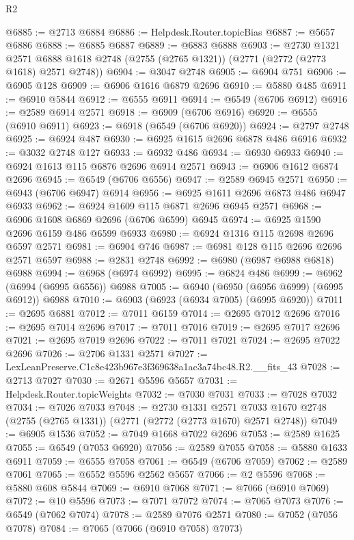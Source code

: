\begin{lexlean}{R2}
\begin{coremodule}
@6885 := @2713 @6884
@6886 := Helpdesk.Router.topicBias
@6887 := @5657 @6886
@6888 := @6885 @6887
@6889 := @6883 @6888
@6903 := @2730
    @1321
    @2571
    @6888
    @1618
    @2748
    (@2755 (@2765 @1321))
    (@2771 (@2772 (@2773 @1618) @2571 @2748))
@6904 := @3047 @2748
@6905 := @6904 @751
@6906 := @6905 @128
@6909 := @6906 @1616 @6879 @2696
@6910 := @5880 @485
@6911 := @6910 @5844
@6912 := @6555 @6911
@6914 := @6549 (@6706 @6912)
@6916 := @2589 @6914 @2571
@6918 := @6909 (@6706 @6916)
@6920 := @6555 (@6910 @6911)
@6923 := @6918 (@6549 (@6706 @6920))
@6924 := @2797 @2748
@6925 := @6924 @487
@6930 := @6925 @1615 @2696 @6878 @486 @6916
@6932 := @3032 @2748 @127
@6933 := @6932 @486
@6934 := @6930 @6933
@6940 := @6924 @1613 @115 @6876 @2696 @6914 @2571
@6943 := @6906 @1612 @6874 @2696
@6945 := @6549 (@6706 @6556)
@6947 := @2589 @6945 @2571
@6950 := @6943 (@6706 @6947) @6914
@6956 := @6925 @1611 @2696 @6873 @486 @6947 @6933
@6962 := @6924 @1609 @115 @6871 @2696 @6945 @2571
@6968 := @6906 @1608 @6869 @2696 (@6706 @6599) @6945
@6974 := @6925 @1590 @2696 @6159 @486 @6599 @6933
@6980 := @6924 @1316 @115 @2698 @2696 @6597 @2571
@6981 := @6904 @746
@6987 := @6981 @128 @115 @2696 @2696 @2571 @6597
@6988 := @2831 @2748
@6992 := @6980 (@6987 @6988 @6818) @6988
@6994 := @6968 (@6974 @6992)
@6995 := @6824 @486
@6999 := @6962 (@6994 (@6995 @6556)) @6988
@7005 := @6940 (@6950 (@6956 @6999) (@6995 @6912)) @6988
@7010 := @6903 (@6923 (@6934 @7005) (@6995 @6920))
@7011 := @2695 @6881
@7012 := @7011 @6159
@7014 := @2695 @7012 @2696
@7016 := @2695 @7014 @2696
@7017 := @7011 @7016
@7019 := @2695 @7017 @2696
@7021 := @2695 @7019 @2696
@7022 := @7011 @7021
@7024 := @2695 @7022 @2696
@7026 := @2706 @1331 @2571
@7027 := LexLeanPreserve.C1c8e423b967e3f369638a1ac3a74bc48.R2.__fits_43
@7028 := @2713 @7027
@7030 := @2671 @5596 @5657
@7031 := Helpdesk.Router.topicWeights
@7032 := @7030 @7031
@7033 := @7028 @7032
@7034 := @7026 @7033
@7048 := @2730
    @1331
    @2571
    @7033
    @1670
    @2748
    (@2755 (@2765 @1331))
    (@2771 (@2772 (@2773 @1670) @2571 @2748))
@7049 := @6905 @1536
@7052 := @7049 @1668 @7022 @2696
@7053 := @2589 @1625
@7055 := @6549 (@7053 @6920)
@7056 := @2589 @7055
@7058 := @5880 @1633 @6911
@7059 := @6555 @7058
@7061 := @6549 (@6706 @7059)
@7062 := @2589 @7061
@7065 := @6552 @5596 @2562 @5657
@7066 := @2 @5596
@7068 := @5880 @608 @5844
@7069 := @6910 @7068
@7071 := @7066 (@6910 @7069)
@7072 := @10 @5596
@7073 := @7071 @7072
@7074 := @7065 @7073
@7076 := @6549 (@7062 @7074)
@7078 := @2589 @7076 @2571
@7080 := @7052 (@7056 @7078)
@7084 := @7065 (@7066 (@6910 @7058) @7073)

\end{coremodule}
\end{lexlean}
